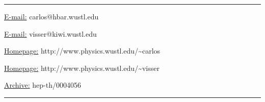 \documentclass[a4paper,12pt]{article}
\begin{document}
\hrule
\bigskip
\centerline{\underline{E-mail:} {\sf carlos@hbar.wustl.edu}}
\centerline{\underline{E-mail:} {\sf visser@kiwi.wustl.edu}}
\bigskip
\centerline{\underline{Homepage:} {\sf http://www.physics.wustl.edu/\~{}carlos}}
\centerline{\underline{Homepage:} {\sf http://www.physics.wustl.edu/\~{}visser}}
\bigskip
\centerline{\underline{Archive:}
{\sf hep-th/0004056}}
\bigskip
\hrule
\clearpage
\def\Box{\nabla^2}
\def\d{{\mathrm d}}
\def\ie{{\em i.e.\/}}
\def\eg{{\em e.g.\/}}
\def\etc{{\em etc.\/}}
\def\etal{{\em et al.\/}}
\def\S{{\mathcal S}}
\def\I{{\mathcal I}}
\def\L{{\mathcal L}}
\def\R{{\mathcal R}}
\def\M{{\mathcal M}}
\def\H{{\mathcal H}}
\def\tr{{\mathrm{tr}}}
\def\implies{\Rightarrow}
\def\half{{1\over2}}
\def\normal{{\mathrm{normal}}}
\def\induced{{\mathrm{induced}}}
\def\stringy{{\mathrm{stringy}}}
\def\graviton{{\mathrm{graviton}}}
\def\critical{{\mathrm{critical}}}
\def\eff{{\mathrm{eff}}}
\def\surface{{\mathrm{surface}}}
\def\bulk{{\mathrm{bulk}}}
\def\boundary{{\mathrm{boundary}}}
\def\matter{{\mathrm{matter}}}
\def\Newton{{\mathrm{Newton}}}
\def\Planck{{\mathrm{Planck}}}
\def\Nordstrom{{Nordstr\"om}}
\def\RNdS{Reissner--\Nordstrom--de~Sitter}
\def\t{{\hat{t}}}
\def\th{{\hat{\theta}}}
\def\SIZE{1.00} %



\clearpage
\end{document}
